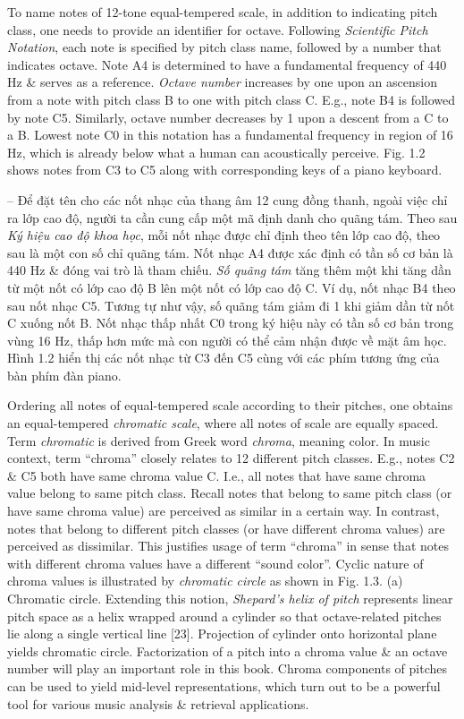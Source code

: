 \documentclass{article}
\begin{document}
\begin{itemize}
\begin{itemize}
\begin{itemize}
			To name notes of 12-tone equal-tempered scale, in addition to indicating pitch class, one needs to provide an identifier for octave. Following {\it Scientific Pitch Notation}, each note is specified by pitch class name, followed by a number that indicates octave. Note A4 is determined to have a fundamental frequency of 440 Hz \& serves as a reference. {\it Octave number} increases by one upon an ascension from a note with pitch class B to one with pitch class C. E.g., note B4 is followed by note C5. Similarly, octave number decreases by 1 upon a descent from a C to a B. Lowest note C0 in this notation has a fundamental frequency in region of 16 Hz, which is already below what a human can acoustically perceive. {\sf Fig. 1.2} shows notes from C3 to C5 along with corresponding keys of a piano keyboard.
			
			-- Để đặt tên cho các nốt nhạc của thang âm 12 cung đồng thanh, ngoài việc chỉ ra lớp cao độ, người ta cần cung cấp một mã định danh cho quãng tám. Theo sau {\it Ký hiệu cao độ khoa học}, mỗi nốt nhạc được chỉ định theo tên lớp cao độ, theo sau là một con số chỉ quãng tám. Nốt nhạc A4 được xác định có tần số cơ bản là 440 Hz \& đóng vai trò là tham chiếu. {\it Số quãng tám} tăng thêm một khi tăng dần từ một nốt có lớp cao độ B lên một nốt có lớp cao độ C. Ví dụ, nốt nhạc B4 theo sau nốt nhạc C5. Tương tự như vậy, số quãng tám giảm đi 1 khi giảm dần từ nốt C xuống nốt B. Nốt nhạc thấp nhất C0 trong ký hiệu này có tần số cơ bản trong vùng 16 Hz, thấp hơn mức mà con người có thể cảm nhận được về mặt âm học. {\sf Hình 1.2} hiển thị các nốt nhạc từ C3 đến C5 cùng với các phím tương ứng của bàn phím đàn piano.
			
			Ordering all notes of equal-tempered scale according to their pitches, one obtains an equal-tempered {\it chromatic scale}, where all notes of scale are equally spaced. Term {\it chromatic} is derived from Greek word {\it chroma}, meaning color. In music context, term ``chroma'' closely relates to 12 different pitch classes. E.g., notes C2 \& C5 both have same chroma value C. I.e., all notes that have same chroma value belong to same pitch class. Recall notes that belong to same pitch class (or have same chroma value) are perceived as similar in a certain way. In contrast, notes that belong to different pitch classes (or have different chroma values) are perceived as dissimilar. This justifies usage of term ``chroma'' in sense that notes with different chroma values have a different ``sound color''. Cyclic nature of chroma values is illustrated by {\it chromatic circle} as shown in {\sf Fig. 1.3. (a) Chromatic circle}. Extending this notion, {\it Shepard's helix of pitch} represents linear pitch space as a helix wrapped around a cylinder so that octave-related pitches lie along a single vertical line [23]. Projection of cylinder onto horizontal plane yields chromatic circle. Factorization of a pitch into a chroma value \& an octave number will play an important role in this book. Chroma components of pitches can be used to yield mid-level representations, which turn out to be a powerful tool for various music analysis \& retrieval applications.
			

\end{itemize}
\end{itemize}
\end{itemize}
\end{document}
